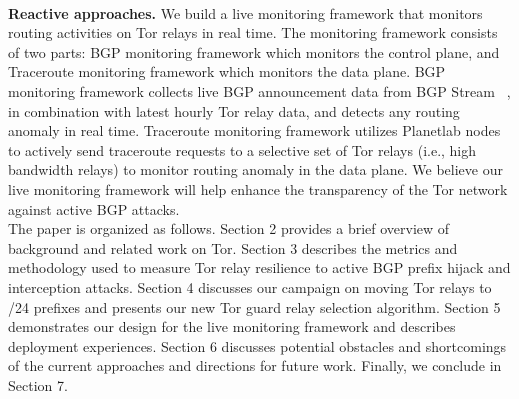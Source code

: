 \\
\textbf{Reactive approaches.} We build a live monitoring framework that monitors routing activities on Tor relays in real time. The monitoring framework consists of two parts: BGP monitoring framework which monitors the control plane, and Traceroute monitoring framework which monitors the data plane. BGP monitoring framework collects live BGP announcement data from BGP Stream ~\cite{bgpstream}, in combination with latest hourly Tor relay data, and detects any routing anomaly in real time. Traceroute monitoring framework utilizes Planetlab nodes to actively send traceroute requests to a selective set of Tor relays (i.e., high bandwidth relays) to monitor routing anomaly in the data plane. We believe our live monitoring framework will help enhance the transparency of the Tor network against active BGP attacks.
\\
The paper is organized as follows. Section 2 provides a brief overview of background and related work on Tor.  Section 3 describes the metrics and methodology used to measure Tor relay resilience to active BGP prefix hijack and interception attacks. Section 4 discusses our campaign on moving Tor relays to /24 prefixes and presents our new Tor guard relay selection algorithm. Section 5 demonstrates our design for the live monitoring framework and describes deployment experiences. Section 6 discusses potential obstacles and shortcomings of the current approaches and directions for future work. Finally, we conclude in Section 7. 
%

